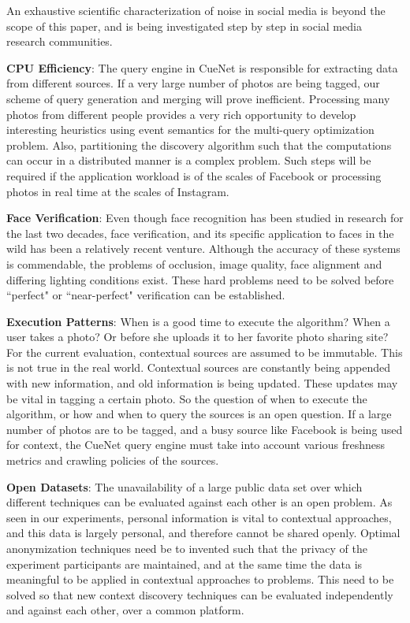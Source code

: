 An exhaustive scientific characterization of noise in social media is beyond the scope of this paper, and is being investigated step by step in social media research communities.

\textbf{\textbf{CPU Efficiency}}: The query engine in CueNet is responsible for extracting data from different sources. If a very large number of photos are being tagged, our scheme of query generation and merging will prove inefficient. Processing many photos from different people provides a very rich opportunity to develop interesting heuristics using event semantics for the multi-query optimization problem. Also, partitioning the discovery algorithm such that the computations can occur in a distributed manner is a complex problem. Such steps will be required if the application workload is of the scales of Facebook or processing photos in real time at the scales of Instagram.

\textbf{\textbf{Face Verification}}: Even though face recognition has been studied in research for the last two decades, face verification, and its specific application to faces in the wild has been a relatively recent venture. Although the accuracy of these systems is commendable, the problems of occlusion, image quality, face alignment and differing lighting conditions exist. These hard problems need to be solved before ``perfect" or ``near-perfect" verification can be established. 

\textbf{\textbf{Execution Patterns}}: When is a good time to execute the algorithm? When a user takes a photo? Or before she uploads it to her favorite photo sharing site? For the current evaluation, contextual sources are assumed to be immutable. This is not true in the real world. Contextual sources are constantly being appended with new information, and old information is being updated. These updates may be vital in tagging a certain photo. So the question of when to execute the algorithm, or how and when to query the sources is an open question. If a large number of photos are to be tagged, and a busy source like Facebook is being used for context, the CueNet query engine must take into account various freshness metrics and crawling policies of the sources. 

\textbf{\textbf{Open Datasets}}: The unavailability of a large public data set over which different techniques can be evaluated against each other is an open problem. As seen in our experiments, personal information is vital to contextual approaches, and this data is largely personal, and therefore cannot be shared openly. Optimal anonymization techniques need be to invented such that the privacy of the experiment participants are maintained, and at the same time the data is meaningful to be applied in contextual approaches to problems. This need to be solved so that new context discovery techniques can be evaluated independently and against each other, over a common platform.


